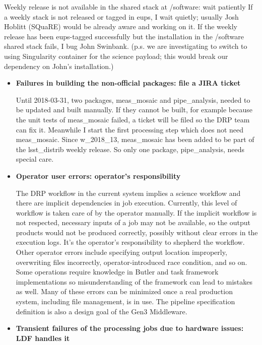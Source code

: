 \documentclass[DM,authoryear,toc]{lsstdoc}
\begin{document}
Weekly release is not available in the shared stack at /software:
wait patiently If a weekly stack is not released or tagged in eups,
I wait quietly; usually Josh Hoblitt (SQuaRE) would be already aware
and working on it. If the weekly release has been eups-tagged
successfully but the installation in the /software shared stack
fails, I bug John Swinbank.  (p.s. we are investigating to switch
to using Singularity container for the science payload; this would
break our dependency on John’s installation.)

\begin{itemize}
  \item \textbf{Failures in building the non-official packages:
  file a JIRA ticket}

  Until 2018-03-31, two packages, meas\_mosaic and pipe\_analysis,
  needed to be updated and built manually. If they cannot be built,
  for example because the unit tests of meas\_mosaic failed, a
  ticket will be filed so the DRP team can fix it. Meanwhile I start
  the first processing step which does not need meas\_mosaic.  Since
  w\_2018\_13,  meas\_mosaic has been added to be part of the
  lsst\_distrib weekly release.  So only one package, pipe\_analysis,
  needs special care.

  \item \textbf{Operator user errors: operator’s responsibility}

  The DRP workflow in the current system implies a science workflow
  and there are implicit dependencies in job execution. Currently,
  this level of workflow is taken care of by the operator manually.
  If the implicit workflow is not respected, necessary inputs of a
  job may not be available, so the output products would not be
  produced correctly, possibly without clear errors in the execution
  logs. It’s the operator’s responsibility to shepherd the workflow.
  Other operator errors include specifying output location improperly,
  overwriting files incorrectly, operator-introduced race condition,
  and so on. Some operations require knowledge in Butler and task
  framework implementations so  misunderstanding of the framework
  can lead to mistakes as well. Many of these errors can be minimized
  once a real production system, including file management, is in
  use. The pipeline specification definition is also a design goal
  of the Gen3 Middleware.

  \item \textbf{Transient failures of the processing jobs due to
  hardware issues: LDF handles it}


\end{itemize}
\end{document}
